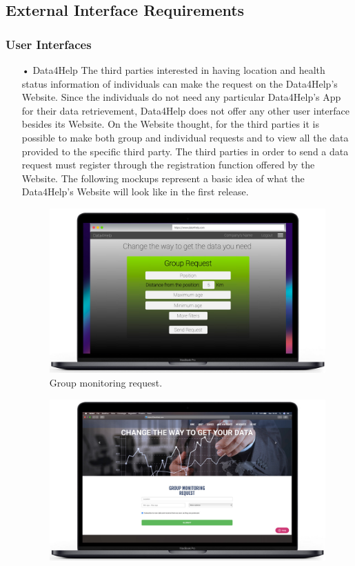 \subsection{External Interface Requirements}
\subsubsection{User Interfaces}
\begin{enumerate}
\item[•]{\Large Data4Help}
\bigbreak
\noindent
The third parties interested in having location and health status information of individuals can make the request on the Data4Help’s Website. Since the individuals do not need any particular Data4Help’s App for their data retrievement, Data4Help does not offer any other user interface besides its Website. 
On the Website thought, for the third parties it is possible to make both group and individual requests and to view all the data provided to the specific third party. The third parties in order to send a data request must register through the registration function offered by the Website.
\bigbreak
\noindent
The following mockups represent a basic idea of what the Data4Help’s Website will look like in the first release.
\\ [2cm]
\begin{figure}[H]
\centering
\includegraphics[scale=0.3]{Images/Mockups/GR.jpg}
\caption{Group monitoring request.}
\end{figure}
\begin{figure}
\centering
\includegraphics[scale=0.3]{Images/Mockups/IR.jpg}

\end{figure}
\end{enumerate}
